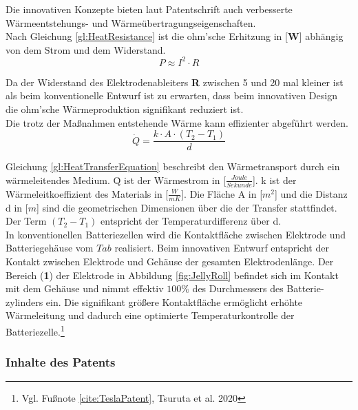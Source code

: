 Die innovativen Konzepte bieten laut Patentschrift auch verbesserte Wärmeentstehungs- und Wärmeübertragungseigenschaften.\\
Nach Gleichung \ref{gl:HeatResistance} ist die ohm'sche Erhitzung in [\textbf{W}] abhängig von dem Strom und dem Widerstand. 
\begin{equation}
	 P \approx I^{2} \cdot R
	 \label{gl:HeatResistance}
\end{equation}

Da der Widerstand des Elektrodenableiters \textbf{R} zwischen 5 und 20 mal kleiner ist als beim konventionelle Entwurf ist zu erwarten, dass beim innovativen Design die ohm'sche Wärmeproduktion signifikant reduziert ist.\\
Die trotz der Maßnahmen entstehende Wärme kann effizienter abgeführt werden.
\begin{equation}
	\dot{Q} = \frac{k\cdot A\cdot (T_{2} - T_{1})}{d} 
	\label{gl:HeatTransferEquation}
\end{equation}

Gleichung \ref{gl:HeatTransferEquation} beschreibt den Wärmetransport durch ein wärmeleitendes Medium. \.{Q} ist der Wärmestrom in [\textbf{$\frac{Joule}{Sekunde}$}]. k ist der Wärmeleitkoeffizient des Materials in [\textbf{$\frac{W}{mK}$}].
Die Fläche A in [\textbf{$m^{2}$}] und die Distanz d in [\textbf{$m$}] sind die geometrischen Dimensionen über die der Transfer stattfindet. Der Term $(T_{2}-T_{1})$ entspricht der Temperaturdifferenz über d.\\
In konventionellen Batteriezellen wird die Kontaktfläche zwischen Elektrode und Batteriegehäuse vom $Tab$ realisiert. Beim innovativen Entwurf entspricht der Kontakt zwischen Elektrode und Gehäuse der gesamten Elektrodenlänge. Der Bereich (\textbf{1}) der Elektrode in Abbildung \ref{fig:JellyRoll} befindet sich im Kontakt mit dem Gehäuse und nimmt effektiv $100\percent$ des Durchmessers des Batterie-\newline zylinders ein. Die signifikant größere Kontaktfläche ermöglicht erhöhte Wärmeleitung und dadurch eine optimierte Temperaturkontrolle der Batteriezelle.\footnote{Vgl. Fußnote \ref{cite:TeslaPatent}, Tsuruta et al. 2020}\\

\subsubsection*{Inhalte des Patents}\label{subsub:PatentContents}

